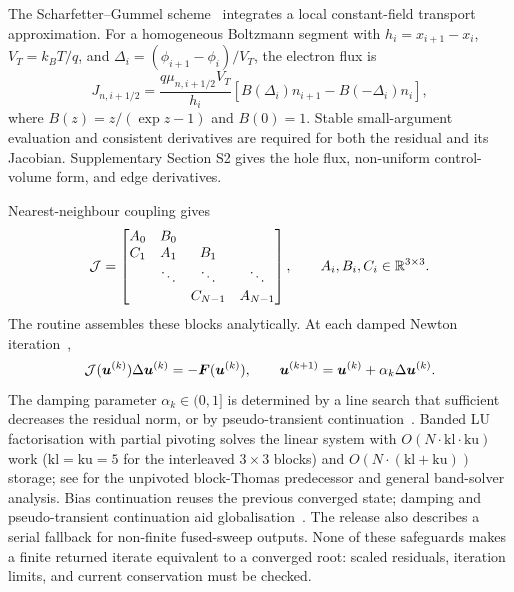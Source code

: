 The Scharfetter--Gummel scheme~\cite{scharfetter1969} integrates a local
constant-field transport approximation. For a homogeneous Boltzmann
segment with $h_i=x_{i+1}-x_i$, $V_T=k_BT/q$, and
$\Delta_i=(\phi_{i+1}-\phi_i)/V_T$, the electron flux is
\begin{equation}
J_{n,i+1/2}=\frac{q\mu_{n,i+1/2}V_T}{h_i}
\left[B(\Delta_i)n_{i+1}-B(-\Delta_i)n_i\right],\label{eq:sg}
\end{equation}
where $B(z)=z/(\exp z-1)$ and $B(0)=1$. Stable small-argument
evaluation and consistent derivatives are required for both the residual
and its Jacobian. Supplementary Section S2 gives the hole flux,
non-uniform control-volume form, and edge derivatives.

Nearest-neighbour coupling gives
\begin{equation}
\mathcal{J}=\begin{bmatrix}
A_0&B_0&&\\
C_1&A_1&B_1&\\
&\ddots&\ddots&\ddots\\
&&C_{N-1}&A_{N-1}
\end{bmatrix},\qquad A_i,B_i,C_i\in\mathbb{R}^{3\times3}.
\label{eq:blocks}
\end{equation}
The  routine assembles these blocks analytically.
At each damped Newton iteration~\cite{mann2022partial},
\begin{equation}
\mathcal{J}(\boldsymbol{u}^{(k)})\Delta\boldsymbol{u}^{(k)}=-\boldsymbol{F}(\boldsymbol{u}^{(k)}),\qquad
\boldsymbol{u}^{(k+1)}=\boldsymbol{u}^{(k)}+\alpha_k\Delta\boldsymbol{u}^{(k)}.
\label{eq:newton}
\end{equation}
The damping parameter $\alpha_k\in(0,1]$ is determined by a line search
that sufficient decreases the residual norm, or by pseudo-transient
continuation~\cite{kelley1996}. Banded LU factorisation with partial
pivoting solves the linear system with $O(N\cdot\mathrm{kl}\cdot
\mathrm{ku})$ work ($\mathrm{kl}=\mathrm{ku}=5$ for the interleaved
$3\times3$ blocks) and $O(N\cdot(\mathrm{kl}+\mathrm{ku}))$ storage;
see \cite{thomas1949,demmel1995,lapack1999} for the unpivoted
block-Thomas predecessor and general band-solver analysis. Bias continuation reuses the
previous converged state; damping and pseudo-transient continuation aid
globalisation~\cite{mann2022partial,kelley1996}. The release also
describes a serial fallback for non-finite fused-sweep outputs. None of
these safeguards makes a finite returned iterate equivalent to a
converged root: scaled residuals, iteration limits, and current
conservation must be checked.

